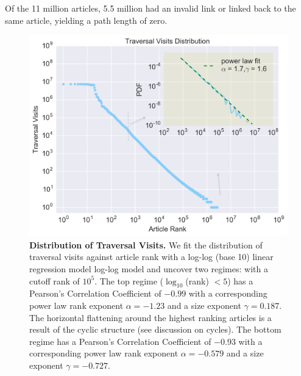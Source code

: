 \documentclass[pre,twocolumn,twoside,byrevtex,superscriptaddress,floatfix]{revtex4-1}
\begin{document}
Of the 11 million articles, 5.5 million had an invalid link or linked back to the same article, yielding a path length of zero. 
\begin{figure}[tp!]
  \includegraphics[width=\columnwidth]{../graphics/traversals_per_article.png} 
  \caption{
    \textbf{Distribution of Traversal Visits.}
We fit the distribution of traversal visits against article rank with a log-log (base 10) linear regression model log-log model and uncover two regimes: 
with a cutoff rank of $10^{5}$.
The top regime ($\log_{10}$(rank) $< 5$) has a Pearson's Correlation 
Coefficient of $-0.99$ 
with a corresponding power law rank exponent 
$\alpha = -1.23$ and a size exponent $\gamma = 0.187$.
The horizontal flattening around the highest
ranking articles is a result of the cyclic structure (see discussion on cycles).
The bottom regime has a Pearson's Correlation Coefficient of $-0.93$
with a corresponding power law rank exponent 
$\alpha = -0.579$ and a size exponent $\gamma = -0.727$.}
  \label{fig:Distribution of Visits}

\end{figure}
\end{document}
